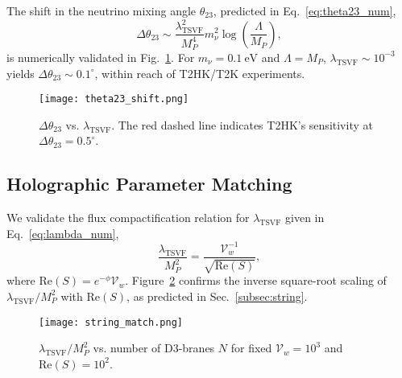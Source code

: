 \documentclass[12pt, onecolumn]{article}
\theoremstyle{definition}
\newcommand{\tsvf}{\lambda_{\mathrm{TSVF}}}
\numberwithin{equation}{section}
\begin{document}
The shift in the neutrino mixing angle \(\theta_{23}\), predicted in Eq.~\eqref{eq:theta23_num},  
\begin{equation}
\Delta\theta_{23} \sim \frac{\tsvf^2}{M_P^4} m_\nu^2 \log\left(\frac{\Lambda}{M_P}\right),  
\label{eq:theta23_num}  
\end{equation}  
is numerically validated in Fig.~\ref{fig:theta23}. For \(m_\nu = 0.1~\mathrm{eV}\) and \(\Lambda = M_P\), \(\tsvf \sim 10^{-3}\) yields \(\Delta\theta_{23} \sim 0.1^\circ\), within reach of T2HK/T2K experiments.  

\begin{figure}[htbp]  
\centering  
\texttt{[image: theta23\_shift.png]}  
\caption{\(\Delta\theta_{23}\) vs. \(\tsvf\). The red dashed line indicates T2HK's sensitivity at \(\Delta\theta_{23} = 0.5^\circ\).}  
\label{fig:theta23}  
\end{figure}  


\subsection{Holographic Parameter Matching}  
\label{subsec:string_sim}  

We validate the flux compactification relation for \(\tsvf\) given in Eq.~\eqref{eq:lambda_num},  
\begin{equation}
\frac{\tsvf}{M_P^2} = \frac{\mathcal{V}_w^{-1}}{\sqrt{\mathrm{Re}(S)}},  
\label{eq:lambda_num}  
\end{equation}  
where \(\mathrm{Re}(S) = e^{-\phi}\mathcal{V}_w\). Figure~\ref{fig:string_match} confirms the inverse square-root scaling of \(\tsvf/M_P^2\) with \(\mathrm{Re}(S)\), as predicted in Sec.~\ref{subsec:string}.  

\begin{figure}[htbp]  
\centering  
\texttt{[image: string\_match.png]}  
\caption{\(\tsvf/M_P^2\) vs. number of D3-branes \(N\) for fixed \(\mathcal{V}_w = 10^3\) and \(\mathrm{Re}(S) = 10^2\).}  
\label{fig:string_match}  
\end{figure}  
\end{document}
